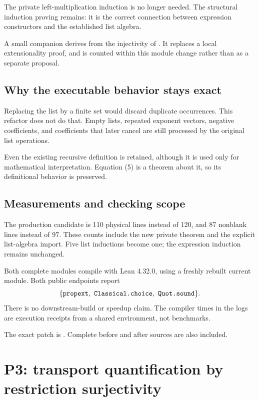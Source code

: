 The private left-multiplication induction is no longer needed. The structural
induction proving  remains: it is the correct connection
between expression constructors and the established list algebra.

A small companion derives  from the injectivity of
. It replaces a local extensionality proof,
and is counted within this module change rather than as a separate proposal.

\subsection{Why the executable behavior stays exact}

Replacing the list by a finite set would discard duplicate occurrences.
This refactor does not do that. Empty lists, repeated exponent vectors,
negative coefficients, and coefficients that later cancel are still processed
by the original list operations.

Even the existing recursive  definition is retained, although
it is used only for mathematical interpretation. Equation (5) is a theorem
about it, so its definitional behavior is preserved.

\subsection{Measurements and checking scope}

The production candidate is 110 physical lines instead of 120, and 87
nonblank lines instead of 97. These counts include the new private theorem
and the explicit list-algebra import. Five list inductions become one; the
expression induction remains unchanged.

Both complete modules compile with Lean 4.32.0, using a freshly rebuilt
current  module. Both public
 endpoints report
\[
 \{\text{\texttt{propext}},\ \text{\texttt{Classical.choice}},\ \text{\texttt{Quot.sound}}\}.
\]
There is no downstream-build or speedup claim. The compiler times in the logs
are execution receipts from a shared environment, not benchmarks.

The exact patch is . Complete before
and after sources are also included.

\section{P3: transport quantification by restriction surjectivity}

